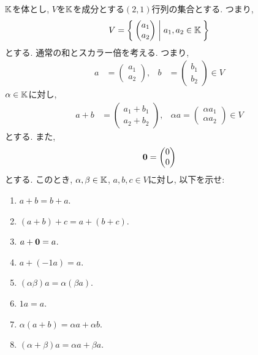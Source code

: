 
\begin{quiz}
  $\mathbb{K}$を体とし, $V$を$\mathbb{K}$を成分とする$(2,1)$行列の集合とする.
  つまり,
  \begin{align*}
    V=\Set{\begin{pmatrix}a_1\\a_2\end{pmatrix}|a_1,a_2\in \mathbb{K}}
  \end{align*}
  とする. 通常の和とスカラー倍を考える.  つまり,
  \begin{align*}
    a&=\begin{pmatrix}a_1\\a_2\end{pmatrix}, & b&=\begin{pmatrix}b_1\\b_2\end{pmatrix} \in V
  \end{align*}
  $\alpha\in\mathbb{K}$に対し,
  \begin{align*}
    a+b&=\begin{pmatrix}a_1+b_1\\a_2+b_2\end{pmatrix}, & \alpha a=\begin{pmatrix}\alpha a_1\\\alpha a_2\end{pmatrix} \in V
  \end{align*}
  とする. また,
  \begin{align*}
  \boldsymbol{0}=
  \begin{pmatrix}
    0\\0
  \end{pmatrix}
  \end{align*}
  とする.
  このとき, $\alpha,\beta\in\mathbb{K}$, $a,b,c\in V$に対し, 以下を示せ:
  \begin{enumerate}
    \item $a+b=b+a$.
    \item $(a+b)+c=a+(b+c)$.
    \item $a+\boldsymbol{0}=a$.
    \item $a+(-1 a)=a$.
    \item $(\alpha\beta)a=\alpha(\beta a)$.
    \item $1a=a$.
    \item $\alpha(a+b)=\alpha a+\alpha b$.
    \item $(\alpha+\beta)a=\alpha a+\beta a$.
  \end{enumerate}
\end{quiz}

